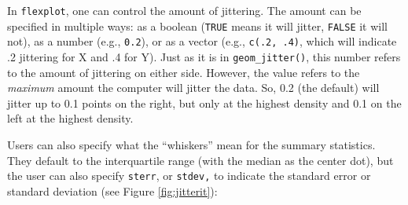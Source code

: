 \documentclass[
  man]{apa6}
\begin{document}
\normalsize

In \texttt{flexplot}, one can control the amount of jittering. The amount can be specified in multiple ways: as a boolean (\texttt{TRUE} means it will jitter, \texttt{FALSE} it will not), as a number (e.g., \texttt{0.2}), or as a vector (e.g., \texttt{c(.2,\ .4)}, which will indicate .2 jittering for X and .4 for Y). Just as it is in \texttt{geom\_jitter()}, this number refers to the amount of jittering on either side. However, the value refers to the \emph{maximum} amount the computer will jitter the data. So, 0.2 (the default) will jitter up to 0.1 points on the right, but only at the highest density and 0.1 on the left at the highest density.

Users can also specify what the ``whiskers'' mean for the summary statistics. They default to the interquartile range (with the median as the center dot), but the user can also specify \texttt{sterr}, or \texttt{stdev,} to indicate the standard error or standard deviation (see Figure \ref{fig:jitterit}):

\small
\end{document}
